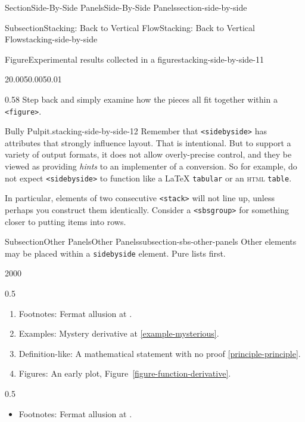 \documentclass[twoside,10pt,]{article}
\newcommand{\xreffont}{\relax}
\newcommand{\mono}[1]{\texttt{#1}}
\newcommand{\initialism}[1]{\textsc{\MakeLowercase{#1}}}
\numberwithin{equation}{section}
\begin{document}
\begin{sectionptx}{Section}{Side-By-Side Panels}{}{Side-By-Side Panels}{}{}{section-side-by-side}
\begin{subsectionptx}{Subsection}{Stacking: Back to Vertical Flow}{}{Stacking: Back to Vertical Flow}{}{}{stacking-side-by-side}
\begin{figureptx}{Figure}{Experimental results collected in a figure}{stacking-side-by-side-11}{}
\begin{sidebyside}{2}{0.005}{0.005}{0.01}
\begin{sbspanel}{0.58}
Step back and simply examine how the pieces all fit together within a \mono{<figure>}.%
\end{sbspanel}%
\end{sidebyside}%
\tcblower
\end{figureptx}%
\begin{paragraphs}{Bully Pulpit.}{stacking-side-by-side-12}%
Remember that \mono{<sidebyside>} has attributes that strongly influence layout.  That is intentional.  But to support a variety of output formats, it does not allow overly-precise control, and they be viewed as providing \emph{hints} to an implementer of a conversion.  So for example, do not expect \mono{<sidebyside>} to function like a \LaTeX{} \mono{tabular} or an \initialism{HTML} \mono{table}.%
\par
In particular, elements of two consecutive \mono{<stack>} will not line up, unless perhaps you construct them identically.  Consider a \mono{<sbsgroup>} for something closer to putting items into rows.%
\end{paragraphs}%
\end{subsectionptx}
%
%
\typeout{************************************************}
\typeout{************************************************}
%
\begin{subsectionptx}{Subsection}{Other Panels}{}{Other Panels}{}{}{subsection-sbs-other-panels}
Other elements may be placed within a \mono{sidebyside} element.  Pure lists first.%
\begin{sidebyside}{2}{0}{0}{0}%
\begin{sbspanel}{0.5}%
%
\begin{enumerate}
\item{}Footnotes: Fermat allusion at \hyperref[footnote-fermat]{{\xreffont 2.1}}.%
\item{}Examples: Mystery derivative at \hyperref[example-mysterious]{{\xreffont\ref{example-mysterious}}}.%
\item{}Definition-like: A mathematical statement with no proof \hyperref[principle-principle]{{\xreffont\ref{principle-principle}}}.%
\item{}Figures: An early plot, Figure~\hyperref[figure-function-derivative]{{\xreffont\ref{figure-function-derivative}}}.%
\end{enumerate}
\end{sbspanel}%
\begin{sbspanel}{0.5}%
%
\begin{itemize}[label=\textbullet]
\item{}Footnotes: Fermat allusion at \hyperref[footnote-fermat]{{\xreffont 2.1}}.%

\end{itemize}
\end{sbspanel}
\end{sidebyside}
\end{subsectionptx}
\end{sectionptx}
\end{document}
